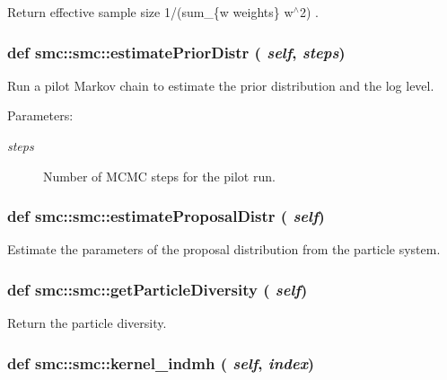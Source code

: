 Return effective sample size 1/(sum\_\-\{w  weights\} w$^\wedge$2) . 

\hypertarget{classsmc_1_1smc_e7f644f3b5cb36aa99f0ebf7b4ebc3a4}{
\subsubsection[{estimatePriorDistr}]{\setlength{\rightskip}{0pt plus 5cm}def smc::smc::estimatePriorDistr ( {\em self}, \/   {\em steps})}}
\label{classsmc_1_1smc_e7f644f3b5cb36aa99f0ebf7b4ebc3a4}


Run a pilot Markov chain to estimate the prior distribution and the log level. 

\begin{Desc}
\item[Parameters:]
\begin{description}
\item[{\em steps}]Number of MCMC steps for the pilot run. \end{description}
\end{Desc}
\hypertarget{classsmc_1_1smc_f567f3fc9711a87297d72cab09fea035}{
\subsubsection[{estimateProposalDistr}]{\setlength{\rightskip}{0pt plus 5cm}def smc::smc::estimateProposalDistr ( {\em self})}}
\label{classsmc_1_1smc_f567f3fc9711a87297d72cab09fea035}


Estimate the parameters of the proposal distribution from the particle system. 

\hypertarget{classsmc_1_1smc_61bd1b39ab3f3dcbfe19cca533276937}{
\subsubsection[{getParticleDiversity}]{\setlength{\rightskip}{0pt plus 5cm}def smc::smc::getParticleDiversity ( {\em self})}}
\label{classsmc_1_1smc_61bd1b39ab3f3dcbfe19cca533276937}


Return the particle diversity. 

\hypertarget{classsmc_1_1smc_747f9eabdfcb52a9a2ccf6ec84bfdb83}{
\subsubsection[{kernel\_\-indmh}]{\setlength{\rightskip}{0pt plus 5cm}def smc::smc::kernel\_\-indmh ( {\em self}, \/   {\em index})}}
\label{classsmc_1_1smc_747f9eabdfcb52a9a2ccf6ec84bfdb83}


